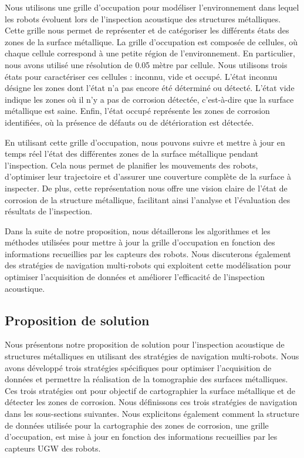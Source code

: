 \documentclass[francais,RandD]{rapportPFE}
\begin{document}
			Nous utilisons une grille d'occupation pour modéliser l'environnement dans lequel les robots évoluent lors de l'inspection acoustique des structures métalliques.
			Cette grille nous permet de représenter et de catégoriser les différents états des zones de la surface métallique.
			La grille d'occupation est composée de cellules, où chaque cellule correspond à une petite région de l'environnement.
			En particulier, nous avons utilisé une résolution de 0.05 mètre par cellule.
			Nous utilisons trois états pour caractériser ces cellules : inconnu, vide et occupé.
			L'état inconnu désigne les zones dont l'état n'a pas encore été déterminé ou détecté.
			L'état vide indique les zones où il n'y a pas de corrosion détectée, c'est-à-dire que la surface métallique est saine.
			Enfin, l'état occupé représente les zones de corrosion identifiées, où la présence de défauts ou de détérioration est détectée.

			En utilisant cette grille d'occupation, nous pouvons suivre et mettre à jour en temps réel l'état des différentes zones de la surface métallique pendant l'inspection.
			Cela nous permet de planifier les mouvements des robots, d'optimiser leur trajectoire et d'assurer une couverture complète de la surface à inspecter.
			De plus, cette représentation nous offre une vision claire de l'état de corrosion de la structure métallique, facilitant ainsi l'analyse et l'évaluation des résultats de l'inspection.

			Dans la suite de notre proposition, nous détaillerons les algorithmes et les méthodes utilisées pour mettre à jour la grille d'occupation en fonction des informations recueillies par les capteurs des robots.
			Nous discuterons également des stratégies de navigation multi-robots qui exploitent cette modélisation pour optimiser l'acquisition de données et améliorer l'efficacité de l'inspection acoustique.
		\subsection{Proposition de solution}
			Nous présentons notre proposition de solution pour l'inspection acoustique de structures métalliques en utilisant des stratégies de navigation multi-robots.
			Nous avons développé trois stratégies spécifiques pour optimiser l'acquisition de données et permettre la réalisation de la tomographie des surfaces métalliques.
			Ces trois stratégies ont pour objectif de cartographier la surface métallique et de détecter les zones de corrosion.
			Nous définissons ces trois stratégies de navigation dans les sous-sections suivantes.
			Nous explicitons également comment la structure de données utilisée pour la cartographie des zones de corrosion, une grille d'occupation, est mise à jour en fonction des informations recueillies par les capteurs UGW des robots.
\end{document}

